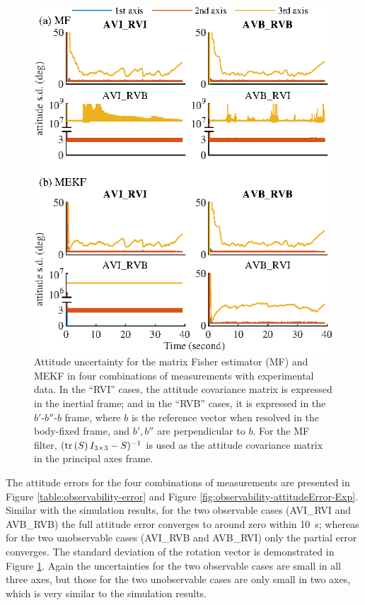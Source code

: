 \begin{figure}
	\centering
	\includegraphics[scale=1.4]{figures/observability/attitudeStd-Exp}
	\caption[Attitude uncertainty for the matrix Fisher estimator (MF) and MEKF in four combinations of measurements with experimental data.]{Attitude uncertainty for the matrix Fisher estimator (MF) and MEKF in four combinations of measurements with experimental data.
		In the ``RVI'' cases, the attitude covariance matrix is expressed in the inertial frame; and in the ``RVB'' cases, it is expressed in the $b'$-$b''$-$b$ frame, where $b$ is the reference vector when resolved in the body-fixed frame, and $b',b''$ are perpendicular to $b$.
		For the MF filter, $(\mathrm{tr}\left( S \right)I_{3\times 3}-S)^{-1}$ is used as the attitude covariance matrix in the principal axes frame. \label{fig:observability-attitudeStd-Exp}}
\end{figure}

The attitude errors for the four combinations of measurements are presented in Figure \ref{table:observability-error} and Figure \ref{fig:observability-attitudeError-Exp}.
Similar with the simulation results, for the two observable cases (AVI\_RVI and AVB\_RVB) the full attitude error converges to around zero within \SI{10}{\second}; whereas for the two unobservable cases (AVI\_RVB and AVB\_RVI) only the partial error converges.
The standard deviation of the rotation vector is demonstrated in Figure \ref{fig:observability-attitudeStd-Exp}.
Again the uncertainties for the two observable cases are small in all three axes, but those for the two unobservable cases are only small in two axes, which is very similar to the simulation results.

